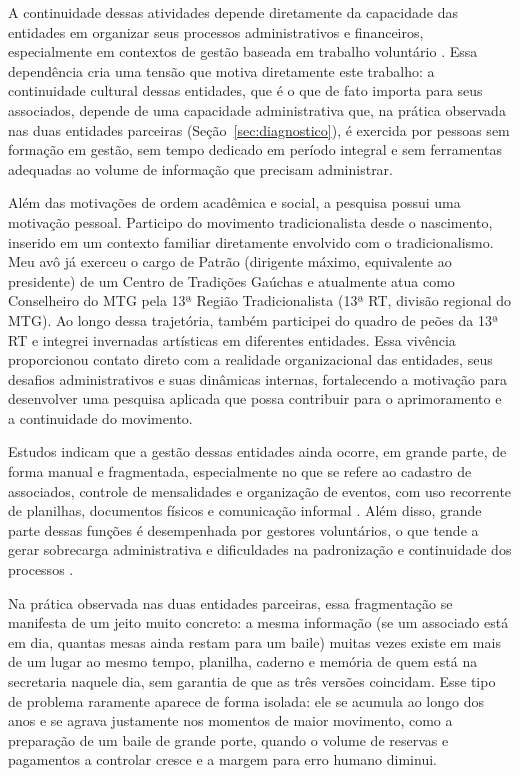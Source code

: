 \documentclass[12pt,a4paper]{article}
\begin{document}
A continuidade dessas atividades depende diretamente
da capacidade das entidades em organizar seus processos administrativos e financeiros, especialmente
em contextos de gestão baseada em trabalho voluntário \parencite{fabricio2019,silvaalbarello2024}.
Essa dependência cria uma tensão que motiva diretamente este trabalho: a continuidade cultural dessas
entidades, que é o que de fato importa para seus associados, depende de uma capacidade administrativa
que, na prática observada nas duas entidades parceiras (Seção~\ref{sec:diagnostico}), é exercida por
pessoas sem formação em gestão, sem tempo dedicado em período integral e sem ferramentas adequadas ao
volume de informação que precisam administrar.

Além das motivações de ordem acadêmica e social, a pesquisa possui uma motivação pessoal. Participo
do movimento tradicionalista desde o nascimento, inserido em um contexto familiar diretamente
envolvido com o tradicionalismo. Meu avô já exerceu o cargo de Patrão (dirigente máximo, equivalente
ao presidente) de um Centro de Tradições Gaúchas e atualmente atua como Conselheiro do MTG pela 13ª
Região Tradicionalista (13ª RT, divisão regional do MTG). Ao
longo dessa trajetória, também participei do quadro de peões da 13ª RT e integrei invernadas
artísticas em diferentes entidades. Essa vivência proporcionou contato direto com a realidade
organizacional das entidades, seus desafios administrativos e suas dinâmicas internas, fortalecendo
a motivação para desenvolver uma pesquisa aplicada que possa contribuir para o aprimoramento e a
continuidade do movimento.

Estudos indicam que a gestão dessas entidades ainda ocorre, em grande parte, de forma manual e
fragmentada, especialmente no que se refere ao cadastro de associados, controle de mensalidades e
organização de eventos, com uso recorrente de planilhas, documentos físicos e comunicação informal
\parencite{jardim2022,silvaalbarello2024}. Além disso, grande parte dessas funções é desempenhada
por gestores voluntários, o que tende a gerar sobrecarga administrativa e dificuldades na
padronização e continuidade dos processos \parencite{fabricio2019}.

Na prática observada nas duas
entidades parceiras, essa fragmentação se manifesta de um jeito muito concreto: a mesma informação
(se um associado está em dia, quantas mesas ainda restam para um baile) muitas vezes existe em mais
de um lugar ao mesmo tempo, planilha, caderno e memória de quem está na secretaria naquele dia, sem
garantia de que as três versões coincidam. Esse tipo de problema raramente aparece de forma isolada:
ele se acumula ao longo dos anos e se agrava justamente nos momentos de maior movimento, como a
preparação de um baile de grande porte, quando o volume de reservas e pagamentos a controlar cresce e
a margem para erro humano diminui.
\end{document}
